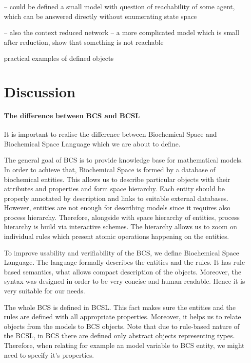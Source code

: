 \documentclass[12pt]{fithesis2}
\begin{document}
-- could be defined a small model with question of reachability of some agent, which can be answered directly without enumerating state space

-- also the context reduced network -- a more complicated model which is small after reduction, show that something is not reachable

practical examples of defined objects

\chapter{Discussion}

\subsubsection{The difference between BCS and BCSL}

It is important to realise the difference between Biochemical Space and Biochemical Space Language which we are about to define.

The general goal of BCS is to provide knowledge base for mathematical models. In order to achieve that, Biochemical Space is formed by a database of biochemical entities. This allows us to describe particular objects with their attributes and properties and form space hierarchy. Each entity should be properly annotated by description and links to suitable external databases. However, entities are not enough for describing models since it requires also process hierarchy. Therefore, alongside with space hierarchy of entities, process hierarchy is build via interactive schemes. The hierarchy allows us to zoom on individual rules which present atomic operations happening on the entities.

To improve usability and verifiability of the BCS, we define Biochemical Space Language. The language formally describes the entities and the rules. It has rule-based semantics, what allows compact description of the objects. Moreover, the syntax was designed in order to be very concise and human-readable. Hence it is very suitable for our needs.

The whole BCS is defined in BCSL. This fact makes sure the entities and the rules are defined with all appropriate properties. Moreover, it helps us to relate objects from the models to BCS objects. Note that due to rule-based nature of the BCSL, in BCS there are defined only abstract objects representing types. Therefore, when relating for example an model variable to BCS entity, we might need to specify it's properties. 
\end{document}
